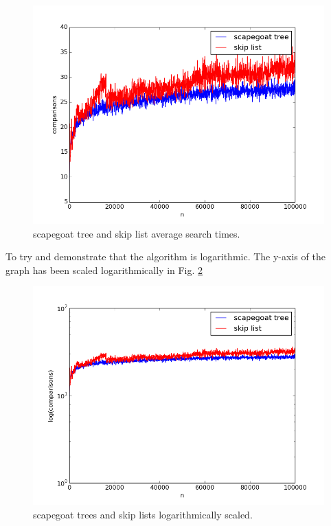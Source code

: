 \documentclass[12pt, a4paper]{article}
\begin{document}
\begin{figure}[H]
    \centering
    \includegraphics[width=1\textwidth]{averagesearch.png}
    \caption{scapegoat tree and skip list average search times.}
    \label{avgsearch}
\end{figure}

To try and demonstrate that the algorithm is logarithmic. The y-axis of the graph has been scaled logarithmically in Fig. \ref{logscale}

\begin{figure}[H]
    \centering
    \includegraphics[width=1\textwidth]{logscale.png}
    \caption{scapegoat trees and skip lists logarithmically scaled.}
    \label{logscale}
\end{figure}
\end{document}

